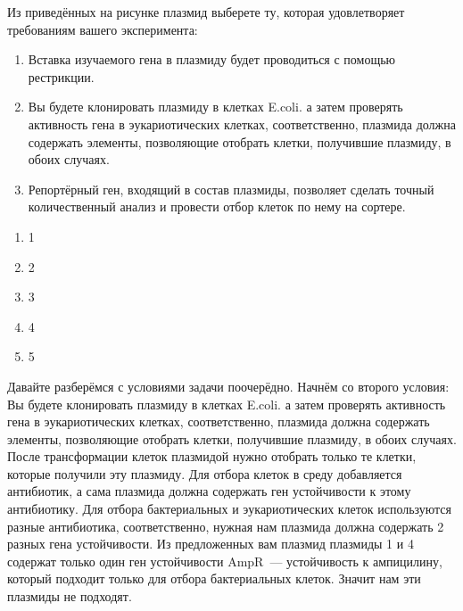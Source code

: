 
Из приведённых на рисунке плазмид выберете ту, которая удовлетворяет требованиям  вашего эксперимента:

\begin{enumerate}
    \item Вставка изучаемого гена в плазмиду будет проводиться с помощью рестрикции.
    \item Вы будете клонировать плазмиду в клетках E.coli. а затем проверять активность гена в эукариотических клетках, соответственно, плазмида должна содержать элементы, позволяющие отобрать клетки, получившие плазмиду, в обоих случаях.
    \item Репортёрный ген, входящий в состав плазмиды, позволяет сделать точный количественный анализ и провести отбор клеток по нему на сортере.
\end{enumerate}






\begin{enumerate}
    \item 1
    \item 2
    \item 3
    \item 4
    \item 5
\end{enumerate}

\explanationSection

Давайте разберёмся с условиями задачи поочерёдно. Начнём со второго условия: Вы будете клонировать плазмиду в клетках E.coli. а затем проверять активность гена в эукариотических клетках, соответственно, плазмида должна содержать элементы, позволяющие отобрать клетки, получившие плазмиду, в обоих случаях. После трансформации клеток плазмидой нужно отобрать только те клетки, которые получили эту плазмиду. Для отбора клеток в среду добавляется антибиотик, а сама плазмида должна содержать ген устойчивости к этому антибиотику. Для отбора бактериальных и эукариотических клеток используются разные антибиотика, соответственно, нужная нам плазмида должна содержать 2 разных гена устойчивости. 
Из предложенных вам плазмид плазмиды 1 и 4 содержат только один ген устойчивости AmpR~— устойчивость к ампицилину, который подходит только для отбора бактериальных клеток. Значит нам эти плазмиды не подходят.

